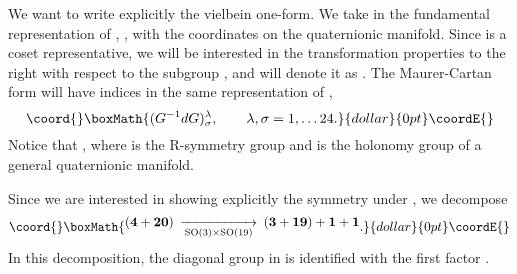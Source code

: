 \documentclass[a4paper,12pt]{article}
\begin{document}
We want to write explicitly the vielbein one-form. We take \coordHE{} in
the fundamental representation of \coordHE{},
\coordHE{}, with \coordHE{} the coordinates on the
quaternionic manifold. Since \coordHE{} is a coset
representative, we will be interested in the transformation
properties to the right with respect to the subgroup
\coordHE{}, and will denote it as
\coordHE{}. The Maurer-Cartan form will have indices in
the same representation of \myHighlight{$\fh$}\coordHE{},
$$\coord{}\boxMath{(G^{-1}dG)^\lambda_\sigma, \qquad \lambda,\sigma=1,\dots 24.}{dollar}{0pt}\coordE{}$$
Notice that \coordHE{}, where
\coordHE{} is the R-symmetry group and \coordHE{}
is the holonomy group of a general quaternionic manifold.


Since we are interested in showing explicitly the symmetry under
\coordHE{}, we decompose
$$\coord{}\boxMath{\begin{CD}(\mathbf{4+20})@>>\rSO(3)\times \rSO(19)>(\mathbf{3+19})+\mathbf{1}+\mathbf{1}\end{CD}.}{dollar}{0pt}\coordE{}$$
In this decomposition, the diagonal group  \coordHE{} in \coordHE{} is identified with the first factor
\coordHE{}.
\end{document}
